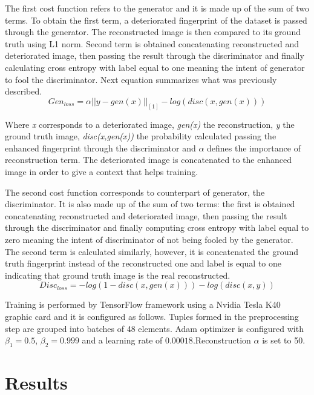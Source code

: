 \documentclass[a4paper,fleqn]{cas-dc}
\begin{document}
The first cost function refers to the generator and it is made up of the sum of two terms. To obtain the first term, a deteriorated fingerprint of the dataset is passed through the generator. The reconstructed image is then compared to its ground truth using L1 norm. Second term is obtained concatenating reconstructed and deteriorated image, then passing the result through the discriminator and finally calculating cross entropy with label equal to one meaning the intent of generator to fool the discriminator. Next equation summarizes what was previously described.
\begin{equation}
Gen_{loss} = \alpha||y-gen(x)||_{[1]} - log(disc(x,gen(x)))
\end{equation}

Where \textit{x} corresponds to a deteriorated image, \textit{gen(x)} the reconstruction, \textit{y} the ground truth image, \textit{disc(x,gen(x))} the probability calculated passing the enhanced fingerprint through the discriminator and $\alpha$ defines the importance of reconstruction term. The deteriorated image is concatenated to the enhanced image in order to give a context that helps training.

The second cost function corresponds to counterpart of generator, the discriminator. It is also made up of the sum of two terms: the first is obtained concatenating reconstructed and deteriorated image, then passing the result through the discriminator and finally computing cross entropy with label equal to zero meaning the intent of discriminator of not being fooled by the generator. The second term is calculated similarly, however, it is concatenated the ground truth fingerprint instead of the reconstructed one and label is equal to one indicating that ground truth image is the real reconstructed.
\begin{equation}
Disc_{loss} = -log(1-disc(x,gen(x)))-log(disc(x,y))
\end{equation}

Training is performed by TensorFlow framework using a Nvidia Tesla K40 graphic card and it is configured as follows. Tuples formed in the preprocessing step are grouped into batches of 48 elements. Adam optimizer is configured with $\beta_{1}=0.5$, $\beta_{2}=0.999$ and a learning rate of $0.00018$.Reconstruction $\alpha$ is set to 50.

\section{Results}
\label{sec:R}
\end{document}

